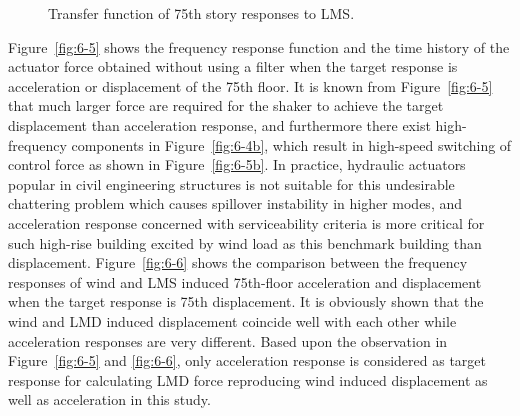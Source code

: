 \begin{figure}[!ht]
\centering
{}
\caption{Transfer function of 75th story responses to LMS.}
\label{fig:6-4}
\end{figure}

Figure~\ref{fig:6-5} shows the frequency response function and the time history of the actuator force obtained without using a filter when the target response is acceleration or displacement of the 75th floor. It is known from Figure~\ref{fig:6-5} that much larger force are required for the shaker to achieve the target displacement than acceleration response, and furthermore there exist high-frequency components in Figure~\ref{fig:6-4b}, which result in high-speed switching of control force as shown in Figure~\ref{fig:6-5b}. In practice, hydraulic actuators popular in civil engineering structures is not suitable for this undesirable chattering problem which causes spillover instability in higher modes, and acceleration response concerned with serviceability criteria is more critical for such high-rise building excited by wind load as this benchmark building than displacement. 
Figure~\ref{fig:6-6} shows the comparison between the frequency responses of wind and LMS induced 75th-floor acceleration and displacement when the target response is 75th displacement. It is obviously shown that the wind and LMD induced displacement coincide well with each other while acceleration responses are very different. Based upon the observation in Figure~\ref{fig:6-5} and  \ref{fig:6-6}, only acceleration response is considered as target response for calculating LMD force reproducing wind induced displacement as well as acceleration in this study.


